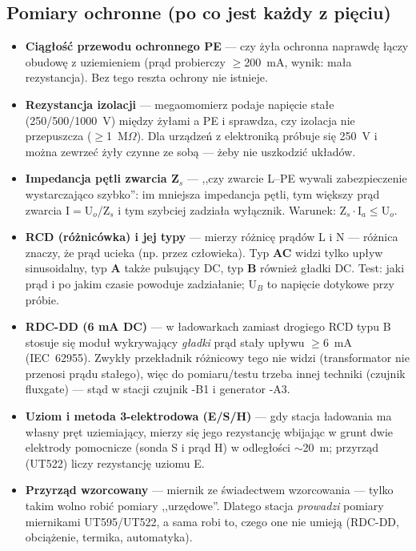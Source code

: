 \documentclass[11pt,a4paper]{article}
\newcommand{\ohm}{$\Omega$}
\newcommand{\poj}[2]{\item \textbf{#1} --- #2}
\begin{document}
\subsection{Pomiary ochronne (po co jest każdy z pięciu)}
\begin{itemize}
\poj{Ciągłość przewodu ochronnego PE}{czy żyła ochronna naprawdę łączy obudowę z uziemieniem
(prąd probierczy $\ge$200~mA, wynik: mała rezystancja). Bez tego reszta ochrony nie istnieje.}
\poj{Rezystancja izolacji}{megaomomierz podaje napięcie stałe (250/500/1000~V) między żyłami
a PE i sprawdza, czy izolacja nie przepuszcza ($\ge$1~M\ohm). Dla urządzeń z elektroniką próbuje
się 250~V i można zewrzeć żyły czynne ze sobą --- żeby nie uszkodzić układów.}
\poj{Impedancja pętli zwarcia Z$_s$}{,,czy zwarcie L--PE wywali zabezpieczenie wystarczająco
szybko'': im mniejsza impedancja pętli, tym większy prąd zwarcia I$=$U$_o$/Z$_s$ i tym szybciej
zadziała wyłącznik. Warunek: Z$_s\cdot$I$_a\le$U$_o$.}
\poj{RCD (różnicówka) i jej typy}{mierzy różnicę prądów L i N --- różnica znaczy, że prąd ucieka
(np. przez człowieka). Typ \textbf{AC} widzi tylko upływ sinusoidalny, typ \textbf{A} także
pulsujący DC, typ \textbf{B} również gładki DC. Test: jaki prąd i po jakim czasie powoduje
zadziałanie; U$_B$ to napięcie dotykowe przy próbie.}
\poj{RDC-DD (6 mA DC)}{w ładowarkach zamiast drogiego RCD typu B stosuje się moduł wykrywający
\emph{gładki} prąd stały upływu $\ge$6~mA (IEC~62955). Zwykły przekładnik różnicowy tego nie
widzi (transformator nie przenosi prądu stałego), więc do pomiaru/testu trzeba innej techniki
(czujnik fluxgate) --- stąd w stacji czujnik -B1 i generator -A3.}
\poj{Uziom i metoda 3-elektrodowa (E/S/H)}{gdy stacja ładowania ma własny pręt uziemiający, mierzy
się jego rezystancję wbijając w grunt dwie elektrody pomocnicze (sonda S i prąd H) w odległości
$\sim$20~m; przyrząd (UT522) liczy rezystancję uziomu E.}
\poj{Przyrząd wzorcowany}{miernik ze świadectwem wzorcowania --- tylko takim wolno robić pomiary
,,urzędowe''. Dlatego stacja \emph{prowadzi} pomiary miernikami UT595/UT522, a sama robi to,
czego one nie umieją (RDC-DD, obciążenie, termika, automatyka).}
\end{itemize}
\end{document}
